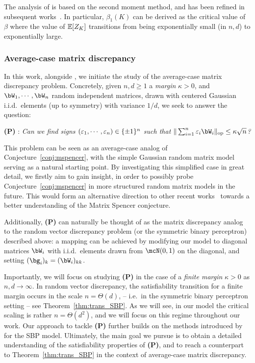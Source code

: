 \noindent
The analysis of \cite{aubin2019storage} is based on the second moment method, and has been refined in subsequent works~\citep{abbe2022proof,gamarnik2022algorithms}. In particular, 
$\beta_1(K)$ can be derived as the critical value of $\beta$ where the value of $\mathbb{E}[Z_K]$ 
transitions from being exponentially small (in $n,d$) to exponentially large.


\subsubsection{Average-case matrix discrepancy}\label{subsubsec:average_mdiscrepancy}

In this work, 
alongside \cite{kunisky2023online},
we initiate the study of the average-case matrix discrepancy problem.
Concretely, given $n, d \geq 1$ a \emph{margin} $\kappa > 0$, and $\bW_1, \cdots, \bW_n$ random independent matrices, drawn with centered Gaussian i.i.d.\ elements (up to symmetry) with variance $1/d$, we seek to answer the question: 
\begin{center}
   \textrm{\textbf{(P)}} : \textit{Can we find signs $(\varepsilon_1, \cdots, \varepsilon_n) \in \{\pm 1\}^n$ such that $\|\sum_{i=1}^n \eps_i \bW_i\|_\op \leq \kappa \sqrt{n}$?}
\end{center}
\noindent 
This problem can be seen as an average-case analog of Conjecture~\ref{conj:mspencer}, with the simple Gaussian random matrix model serving as a natural starting point.
By investigating this simplified case in great detail, we firstly aim to gain insight, 
in order to possibly probe Conjecture~\ref{conj:mspencer} in more structured random matrix models in the future.
This would form an alternative direction to other recent works~\citep{hopkins2022matrix,dadush2022new,bansal2023resolving} towards a better understanding of the Matrix Spencer conjecture.

\myskip 
Additionally, \textbf{(P)} can naturally be thought of as the matrix discrepancy analog to the random vector discrepancy problem (or the symmetric binary perceptron)
described above:
a mapping can be achieved by modifying our model to
diagonal matrices $\bW_i$ with i.i.d.\ elements drawn from $\mcN(0,1)$ on the diagonal, 
and setting $(\bg_i)_k = (\bW_{i})_{kk}$.

\myskip
Importantly, we will focus on studying \textbf{(P)} in the case of a \emph{finite margin} $\kappa > 0$ as $n, d \to \infty$. 
In random vector discrepancy, the satisfiability transition for a finite margin occurs in the scale $n = \Theta(d)$, -- i.e.\ in the symmetric binary perceptron setting -- see Theorem~\ref{thm:trans_SBP}.
As we will see, in our model the critical scaling is rather $n = \Theta(d^2)$, and we will focus on this 
regime throughout our work.
Our approach to tackle \textbf{(P)} further builds on the methods introduced by \cite{aubin2019storage} for the SBP model.
Ultimately, the main goal we pursue is to obtain a detailed understanding of the satisfiability properties of \textbf{(P)}, 
and to reach a counterpart to Theorem~\ref{thm:trans_SBP} in the context of average-case matrix discrepancy.

